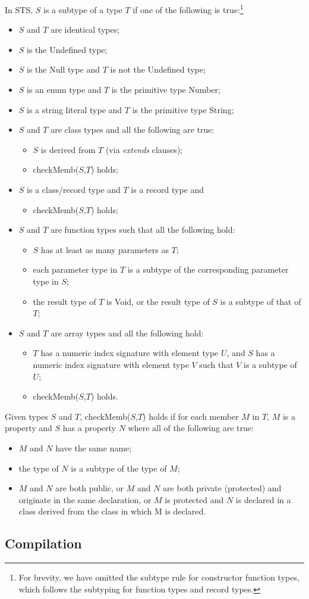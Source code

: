 In STS, $S$ is a subtype of a type $T$ if one of the following is true:\footnote{
For brevity, we have omitted the subtype rule for constructor function types, which
follows the subtyping for function types and record types.}
\begin{itemize}
\item $S$ and $T$ are identical types;
\item $S$ is the Undefined type;
\item $S$ is the Null type and $T$ is not the Undefined type;
\item $S$ is an enum type and $T$ is the primitive type Number;
\item $S$ is a string literal type and $T$ is the primitive type String;
\item $S$ and $T$ are class types and all the following are true:
\begin{itemize}
  \item $S$ is derived from $T$ (via \emph{extends} clauses);
  \item checkMemb($S$,$T$) holds;
\end{itemize}
\item $S$ is a class/record type and $T$ is a record type and
\begin{itemize}
  \item checkMemb($S$,$T$) holds;
\end{itemize}
\item $S$ and $T$ are function types such that all the following hold:
\begin{itemize}
  \item $S$ has at least as many parameters as $T$;
  \item each parameter type in $T$ is a subtype of the corresponding parameter type in $S$;
  \item the result type of $T$ is Void, or the result type of $S$ is a subtype of that of $T$;
\end{itemize}
\item $S$ and $T$ are array types and all the following hold:
\begin{itemize}
\item $T$ has a numeric index signature with element type $U$, 
    and $S$ has a numeric index signature with element type $V$
    such that $V$ is a subtype of $U$;
\item checkMemb($S$,$T$) holds.
\end{itemize}
\end{itemize}

Given types $S$ and $T$, checkMemb($S$,$T$) holds if for each member $M$ in $T$, 
$M$ is a property and $S$ has a property $N$ where all of the following are true:
\begin{itemize}
\item $M$ and $N$ have the same name;
\item the type of $N$ is a subtype of the type of $M$;
\item $M$ and $N$ are both public, or $M$ and $N$ are both 
      private (protected) and originate in the same declaration, 
      or $M$ is protected and $N$ is declared in a class derived from 
      the class in which M is declared.
\end{itemize}

\subsection{Compilation}


